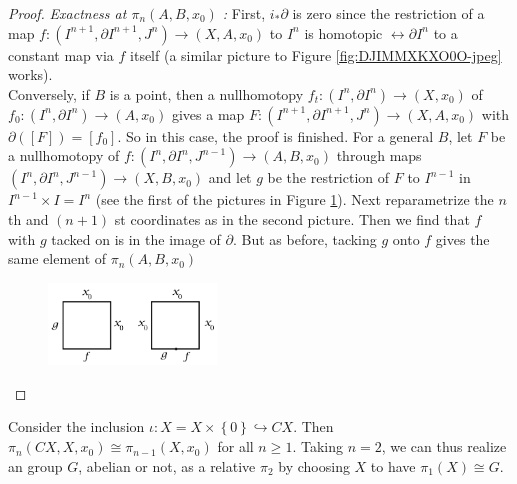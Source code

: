 \begin{proof}
      \textit{Exactness at $\pi_n (A,B,x_0)$ :} 
      First, $i_* \partial$ is zero since
      the restriction of a map
      $f \colon \left( I^{n+1}, \partial I^{n+1},
      J^{n}\right) \to \left( X,A,x_0 \right) $ 
      to $I^{n}$ is homotopic $\rel \partial I^{n}$ to a 
      constant map via $f$ itself (a similar picture
      to Figure \ref{fig:DJIMMXKXO0O-jpeg} works).\\
      Conversely, if $B$ is a point, then
      a nullhomotopy $f_t \colon
      \left( I^{n}, \partial I^{n} \right) 
      \to \left( X, x_0 \right) $ of
      $f_0 \colon \left( I^{n},\partial I^{n} \right) 
      \to \left( A,x_0 \right) $ gives a map
      $F \colon \left( I^{n+1},\partial I^{n+1},J^{n} \right) 
      \to \left( X,A,x_0 \right) $ with
      $\partial \left( \left[ F \right]  \right) 
      = \left[ f_0 \right] $. So in this case, the proof is
      finished.
      For a general $B$, let
      $F$ be a nullhomotopy of
      $f \colon \left( I^{n},\partial I^{n},J^{n-1} \right) 
      \to \left( A,B,x_0 \right) $ through maps
      $\left( I^{n}, \partial I^{n}, J^{n-1} \right) 
      \to \left( X,B,x_0 \right) $ and
      let $g$ be the restriction of
      $F$ to $I^{n-1}$ in $I^{n-1} \times I = I^{n}$ (see
      the first of the pictures in
      Figure \ref{fig:USIIOOQ-png}).
      Next reparametrize the $n$ th and
      $(n+1)$ st coordinates as in the
      second picture. Then 
       we find that $f$ with $g$ tacked on
       is in the image of $\partial$. But
       as before, tacking $g$ onto $f$ gives the
       same element of $\pi_n (A,B,x_0)$

      \begin{figure}[htpb]
          \centering
          \includegraphics[width=0.4\textwidth]{Figures/USIIOOQ.png}
          \caption{}
          \label{fig:USIIOOQ-png}
      \end{figure}
  \end{proof}

  
\begin{corollary}
    Consider the inclusion
    $\iota \colon X = X \times \left\{ 0 \right\} 
    \hookrightarrow CX$.
    Then
    $\pi_n \left( CX, X, x_0 \right) 
    \cong \pi_{n-1}\left( X, x_0 \right) $ for all
    $n\ge 1$. Taking
    $n=2$, we can thus realize an group $G$, abelian
    or not, as a relative $\pi_2$ by
    choosing $X$ to have $\pi_1 (X) \cong G$.
\end{corollary}

